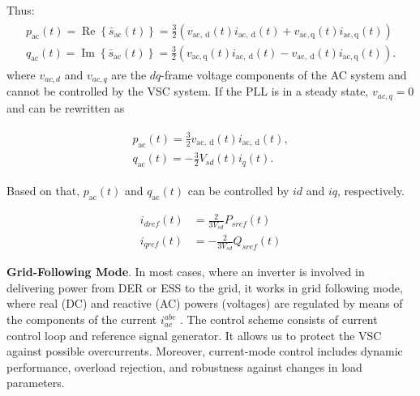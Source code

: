 Thus:
\begin{equation}
    \begin{aligned}
        \begin{array}{l}
            p_{\mathrm{ac}}(t)=\operatorname{Re}\left\{\bar{s}_{\mathrm{ac}}(t)\right\}=\displaystyle\frac{3}{2}\left(v_{\mathrm{ac}, \mathrm{~d}}(t) i_{\mathrm{ac}, \mathrm{~d}}(t)+v_{\mathrm{ac}, \mathrm{q}}(t) i_{\mathrm{ac}, \mathrm{q}}(t)\right) \\[1em]
            q_{\mathrm{ac}}(t)=\operatorname{Im}\left\{\bar{s}_{\mathrm{ac}}(t)\right\}=\displaystyle\frac{3}{2}\left(v_{\mathrm{ac}, \mathrm{q}}(t) i_{\mathrm{ac}, \mathrm{~d}}(t)-v_{\mathrm{ac}, \mathrm{~d}}(t) i_{\mathrm{ac}, \mathrm{q}}(t)\right) .
        \end{array}
    \end{aligned}
\end{equation}
where $v_{ac,d}$ and $v_{ac,q}$ are the $dq$-frame voltage components of the AC system and cannot be controlled by the VSC system. If the PLL is in a steady state, $v_{ac,q}=0$ and can be rewritten as

\begin{equation}
    \begin{aligned}
        \begin{array}{l}
            p_{\mathrm{ac}}(t) = \displaystyle\frac{3}{2} v_{\mathrm{ac}, \mathrm{~d}}(t)i_{\mathrm{ac}, \mathrm{~d}}(t), \\[1em]
            q_{\mathrm{ac}}(t) = -\displaystyle\frac{3}{2} V_{sd}(t)i_q(t).
        \end{array}
    \end{aligned}
\end{equation}

Based on that, $p_{\mathrm{ac}}(t)$ and $q_{\mathrm{ac}}(t)$ can be controlled by $id$ and $iq$, respectively.

\begin{equation}
    \begin{aligned}
        i_{dref}(t) & =\frac{2}{3V_{sd}} P_{sref}(t) \\[1em]
        i_{qref}(t) & =-\frac{2}{3 V_{sd}} Q_{sref}(t)
    \end{aligned}
\end{equation}

\textbf{Grid-Following Mode}. In most cases, where an inverter is involved in delivering power from DER or ESS to the grid, it works in grid following mode, where real (DC) and reactive (AC) powers (voltages) are regulated by means of the components of the current $i_{ac}^{abc}$ \autocite{720325}. 
The control scheme consists of current control loop and reference signal generator. It allows us to protect the VSC against possible overcurrents. Moreover, current-mode control includes dynamic performance, overload rejection, and robustness against changes in load parameters.

